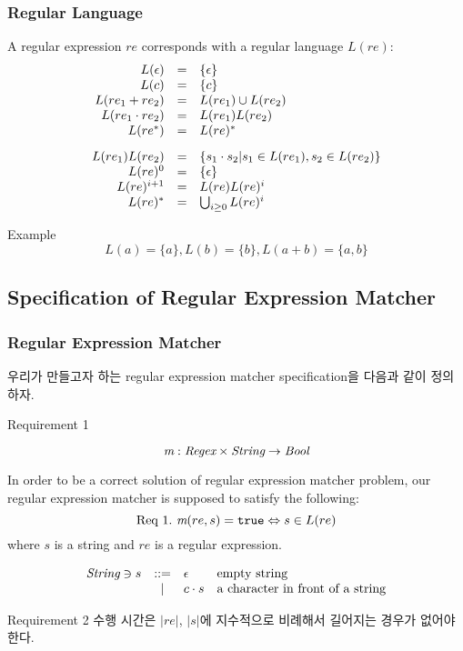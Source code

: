 \begin{frame}

\frametitle{Regular Language}

A regular expression $re$ corresponds with a regular language
$L(re)$:
\[
\begin{array}{rcl}
  L(\e) & = & \{\e\} \\
  L(c) & = & \{c\} \\
  L(\replus) & = & L(\rone) \cup L(\rtwo) \\
  L(\retimes) & = & L(\rone)L(\rtwo) \\
  L(\restar) & = & L(re)^{*} \\[3mm]
  L(\rone)L(\rtwo) & = & \{s_{1}\cdot s_{2} | s_{1}\in L(\rone), s_{2}\in L(\rtwo)\} \\
  L(re)^{0} & = & \{\e\} \\
  L(re)^{i+1} & = & L(re)L(re)^{i} \\
  L(re)^{*} & = & \bigcup_{i\ge 0}L(re)^{i}
\end{array}
\]

\begin{block}{Example}
    \[
        L(a) = \{a\}, L(b) = \{b\}, L(a+b) = \{a, b\}
        \]
\end{block}

\end{frame}

\subsection{Specification of Regular Expression Matcher}

\begin{frame}
\frametitle{Regular Expression Matcher}

우리가 만들고자 하는 regular expression matcher  
specification을 다음과 같이 정의하자.

\begin{block}{Requirement 1}

\[
    \M : \mbit{Regex} \times \mbit{String} \ra \mbit{Bool}
\]

In order to be a correct solution of regular expression matcher problem, 
our regular expression matcher \M{} is supposed to satisfy the following:
 \[
    \mbrm{Req 1.}\ \rmatch{s}{re} = \T \Lra s \in L(re) 
 \]
where $s$ is a string and $re$ is a regular expression.

\[
\begin{array}{lcll}
    \mbit{String} \ni  s & ::= & \e & \mbox{empty string} \\
    & | & c \cdot s & \mbox{a character in front of a string}
\end{array}
\]
\end{block}

\begin{block}{Requirement 2}
수행 시간은 $|re|$, $|s|$에 지수적으로 비례해서 길어지는 경우가 없어야 한다.
\end{block}

\end{frame}
